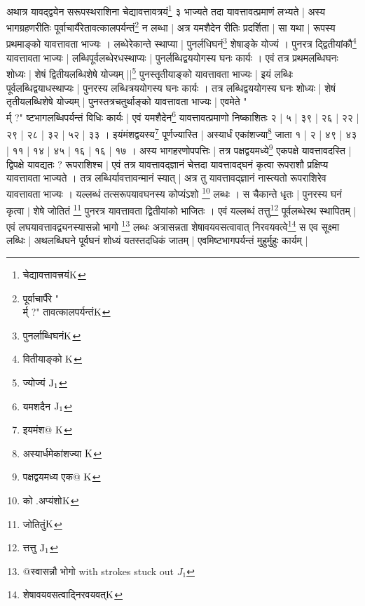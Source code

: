 \documentclass[11pt,a5paper]{book}
\begin{document}
\newpage 


\newpage 
{\s अथात्र यावद्द्वयेन सरूपस्थराशिना
चेद्यावत्तावत्रयं\footnote{{\s चेद्यावत्तावत्त्रयं}${\rm K}$}
३ भाज्यते
तदा यावत्तावत्प्रमाणं लभ्यते |
अस्य भागग्रहणरीतिः पूर्वाचार्यैरेतावत्कालपर्यन्तं\footnote{{\s पूर्वाचार्पैरे "{\\र्म् ?}" तावत्कालपर्यन्तं}${\rm K}$}
न लब्धा |
अत्र यमशैदेन रीतिः प्रदर्शिता | 
सा यथा | 
रूपस्य प्रथमाङ्को यावत्तावता भाज्यः । लब्धेरेकान्ते
स्थाप्या | 
पुनर्लधिघनं\footnote{{\s पुनर्लाब्धिघनं}${\rm K}$} शेषाङ्के योज्यं । पुनरत्र
द्द्वितीयांकौ\footnote{{\s  वितीयाङ्को }${\rm K}$}
यावत्तावता भाज्यः |
लब्धिपूर्वलब्धेरधस्थाप्यः | 
पुनर्लब्धिद्वययोगस्य घनः कार्यः । 
एवं तत्र प्रथमलब्धिघनः शोध्यः | 
शेषं द्वितीयलब्धिशेषे योज्यम् ||\footnote{{\s ज्योज्यं }${\rm J_1}$}
पुनस्तृतीयाङ्को यावत्तावता भाज्यः | 
इयं लब्धिः पूर्वलब्धिद्वयाधस्थाप्यः | 
पुनरस्य लब्धित्रययोगस्य घनः कार्यः । 
तत्र लब्धिद्वययोगस्य घनः शोध्यः | 
शेषं तृतीयलब्धिशेषे योज्यम् | 
पुनस्तत्रचतुर्थाङ्को यावत्तावता भाज्यः | 
एवमेते "{\\र्म् ?}" ष्टभागलब्धिपर्यन्तं विधिः कार्यः | 
एवं यमशैदेन\footnote{{\s यमशदैन }${\rm J_1}$}
यावत्तावत्प्रमाणो निष्काशितः २ | ५ | ३९ | २६ | २२ | २९ | २८ | ३२ | ५२ | ३३ ।
इयंमंशद्वयस्य\footnote{{\s इयमंश@ }${\rm K}$}
पूर्णज्यास्ति | 
अस्यार्धं एकांशज्या\footnote{{\s अस्यार्धमेकांशज्या }${\rm K}$} जाता १ | २ | ४९ | ४३ | ११ | १४ | ४५ | १६ | १६ | १७ । 
अस्य भागहरणोपपत्तिः | 
तत्र पक्षद्वयमध्ये\footnote{{\s पक्षद्वयमध्य एक@ }${\rm K}$} एकपक्षे
यावत्तावदस्ति | 
द्विपक्षे यावद्यतः $?$ रूपराशिश्च | 
एवं तत्र यावत्तावद्ज्ञानं चेत्तदा यावत्तावद्घनं कृत्वा
रूपराशौ प्रक्षिप्य यावत्तावता भाज्यते । तत्र लब्धिर्यावत्तावन्मानं
स्यात् | 
अत्र तु यावत्तावद्ज्ञानं
नास्त्यतो रूपराशिरेव यावत्तावता भाज्यः । 
यल्लब्धं तत्सरूपयावघनस्य कोप्यंऽशो \footnote{{\s को .अप्यंशो}${\rm K}$} लब्धः । 
स चैकान्ते धृतः | 
पुनरस्य घनं कृत्वा $|$ 
शेषे जोतितं \footnote{{\s जोतितुं}${\rm K}$} पुनरत्र यावत्तावता द्वितीयांको भाजितः । 
एवं यल्लब्धं तत्तु\footnote{{\s त्तत्तु }${\rm J_1}$}
पूर्वलब्धेरथ स्थापितम् | 
एवं लघयावत्तावद्व्यनस्यासन्नो भागो
\footnote{{\s @स्वासन्नौ भोगो } with strokes stuck out $J_1$} %
लब्धः %
अत्रासन्नता शेषावयवसत्वावात् निरवयवत्वे\footnote{{\s शेषावयवसत्वाद्निरवयवत्}${\rm K}$} स एव सूक्ष्मा
लब्धिः | 
अथलब्धिघने पूर्वघनं शोध्यं यतस्तदधिकं जातम् | 
एवमिष्टभागपर्यन्तं मुहुर्मुहुः कार्यम् | }


\newpage 
\end{document}
